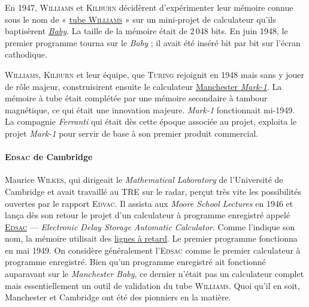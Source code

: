En 1947, \textsc{Williams} et \textsc{Kilburn} décidèrent d’expérimenter leur mémoire connue sous le nom de « \href{https://fr.wikipedia.org/wiki/Tube_de_Williams}{tube \textsc{Williams}} » sur un mini-projet de calculateur qu’ils baptisèrent \href{https://www.youtube.com/watch?v=uUa1JRc8Xz0&feature=youtu.be}{\textit{Baby}}. La taille de la mémoire était de $2\,048$ bits. En juin 1948, le premier programme tourna sur le \textit{Baby} ; il avait été inséré bit par bit sur l’écran cathodique.

\textsc{Williams}, \textsc{Kilburn} et leur équipe, que \textsc{Turing} rejoignit en 1948 mais sans y jouer de rôle majeur, construisirent ensuite le calculateur \href{https://fr.wikipedia.org/wiki/Manchester_Mark_I}{Manchester \textit{Mark-1}}. La mémoire à tube était complétée par une mémoire secondaire à tambour magnétique, ce qui était une innovation majeure. \textit{Mark-1} fonctionnait mi-1949. La compagnie \textit{Ferranti} qui était dès cette époque associée au projet, exploita le projet \textit{Mark-1} pour servir de base à son premier produit commercial.

\paragraph*{\textsc{Edsac} de Cambridge}
Maurice \textsc{Wilkes}, qui dirigeait le \textit{Mathematical Laboratory} de l’Université de Cambridge et avait travaillé au TRE sur le radar, perçut très vite les possibilités ouvertes par le rapport \textsc{Edvac}. Il assista aux \textit{Moore School Lectures} en 1946 et lança dès son retour le projet d’un calculateur à programme enregistré appelé \href{https://en.wikipedia.org/wiki/EDSAC}{\textsc{Edsac}} --- \textit{Electronic Delay Storage Automatic Calculator}. Comme l’indique son nom, la mémoire utilisait des \href{https://fr.wikipedia.org/wiki/M\%C3\%A9moire_\%C3\%A0_ligne_de_d\%C3\%A9lai}{lignes à retard}. Le premier programme fonctionna en mai 1949.
On considère généralement l’\textsc{Edsac} comme le premier calculateur à programme enregistré. Bien qu’un programme enregistré ait fonctionné auparavant sur le \textit{Manchester Baby}, ce dernier n’était pas un calculateur complet mais essentiellement un outil de validation du tube \textsc{Williams}. Quoi qu’il en soit, Manchester et Cambridge ont été des pionniers en la matière.

